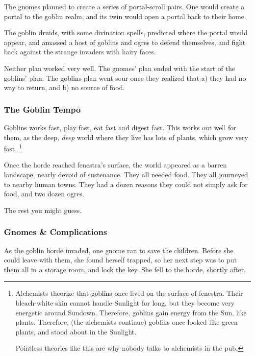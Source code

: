 \begin{multicols}{2}
\begin{exampletext}
  The gnomes planned to create a series of portal-scroll pairs.
  One would create a portal to the goblin realm, and its twin would open a portal back to their home.

  The goblin druids, with some divination spells, predicted where the portal would appear, and amassed a host of goblins and ogres to defend themselves, and fight back against the strange invaders with hairy faces. 

  Neither plan worked very well.
  The gnomes' plan ended with the start of the goblins' plan.
  The goblins plan went sour once they realized that a) they had no way to return, and b) no source of food.

  \subsubsection{The Goblin Tempo}
  Goblins works fast, play fast, eat fast and digest fast.
  This works out well for them, as the deep, \emph{deep} world where they live has lots of plants, which grow very fast.%
  \footnote{Alchemists theorize that goblins once lived on the surface of \gls{fenestra}.
  Their bleach-white skin cannot handle Sunlight for long, but they become very energetic around Sundown.
  Therefore, goblins gain energy from the Sun, like plants.
  Therefore, (the alchemists continue) goblins once looked like green plants, and stood about in the Sunlight.

  Pointless theories like this are why nobody talks to alchemists in the pub.}


  Once the horde reached \gls{fenestra}'s surface, the world appeared as a barren landscape, nearly devoid of sustenance.
  They all needed food.
  They all journeyed to nearby human towns.
  They had a dozen reasons they could not simply ask for food, and two dozen ogres.

  The rest you might guess.

\end{exampletext}


\subsubsection{Gnomes \& Complications}
\label{saving_the_children}

\begin{exampletext}
  As the goblin horde invaded, one gnome ran to save the children.
  Before she could leave with them, she found herself trapped, so her next step was to put them all in a storage room, and lock the key.
  She fell to the horde, shortly after.


\end{exampletext}
\end{multicols}
